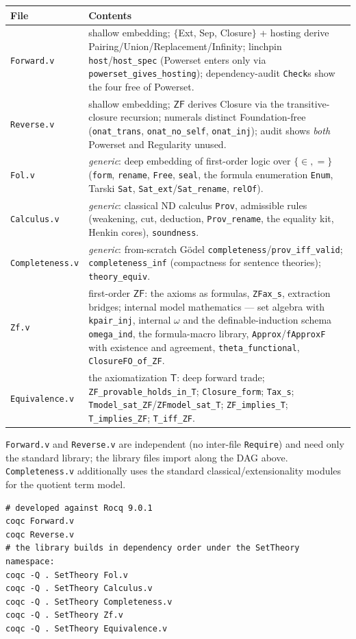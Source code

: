 \documentclass[11pt]{article}
\theoremstyle{plain}
\theoremstyle{definition}
\newcommand{\ZF}{\mathsf{ZF}}
\renewcommand{\ZF}{\textsf{ZF}}
\newcommand{\T}{\textsf{T}}
\newcommand{\cq}[1]{\lstinline[basicstyle=\ttfamily]|#1|}
\begin{document}
\begin{center}
\renewcommand{\arraystretch}{1.25}
\begin{tabular}{@{}lp{}@{}}
\toprule
File & Contents \\
\midrule
\texttt{Forward.v} & shallow embedding; $\{$Ext, Sep, Closure$\}$ + hosting derive Pairing/Union/Replacement/Infinity; linchpin \cq{host}/\cq{host_spec} (Powerset enters only via \cq{powerset_gives_hosting}); dependency-audit \cq{Check}s show the four free of Powerset. \\
\texttt{Reverse.v} & shallow embedding; $\ZF$ derives Closure via the transitive-closure recursion; numerals distinct Foundation-free (\cq{onat_trans}, \cq{onat_no_self}, \cq{onat_inj}); audit shows \emph{both} Powerset and Regularity unused. \\
\texttt{Fol.v} & \emph{generic}: deep embedding of first-order logic over $\{\in,=\}$ (\cq{form}, \cq{rename}, \cq{Free}, \cq{seal}, the formula enumeration \cq{Enum}, Tarski \cq{Sat}, \cq{Sat_ext}/\cq{Sat_rename}, \cq{relOf}). \\
\texttt{Calculus.v} & \emph{generic}: classical ND calculus \cq{Prov}, admissible rules (weakening, cut, deduction, \cq{Prov_rename}, the equality kit, Henkin cores), \cq{soundness}. \\
\texttt{Completeness.v} & \emph{generic}: from-scratch G\"odel \cq{completeness}/\cq{prov_iff_valid}; \cq{completeness_inf} (compactness for sentence theories); \cq{theory_equiv}. \\
\texttt{Zf.v} & first-order $\ZF$: the axioms as formulas, \cq{ZFax_s}, extraction bridges; internal model mathematics --- set algebra with \cq{kpair_inj}, internal $\omega$ and the definable-induction schema \cq{omega_ind}, the formula-macro library, \cq{Approx}/\cq{fApproxF} with existence and agreement, \cq{theta_functional}, \cq{ClosureFO_of_ZF}. \\
\texttt{Equivalence.v} & the axiomatization $\T$: deep forward trade; \cq{ZF_provable_holds_in_T}; \cq{Closure_form}; \cq{Tax_s}; \cq{Tmodel_sat_ZF}/\cq{ZFmodel_sat_T}; \cq{ZF_implies_T}; \cq{T_implies_ZF}; \cq{T_iff_ZF}. \\
\bottomrule
\end{tabular}
\end{center}

\texttt{Forward.v} and \texttt{Reverse.v} are independent (no inter-file
\cq{Require}) and need only the standard library; the library files import along
the DAG above. \texttt{Completeness.v} additionally uses the standard
classical/extensionality modules for the quotient term model.

\begin{lstlisting}[language={}]
# developed against Rocq 9.0.1
coqc Forward.v
coqc Reverse.v
# the library builds in dependency order under the SetTheory namespace:
coqc -Q . SetTheory Fol.v
coqc -Q . SetTheory Calculus.v
coqc -Q . SetTheory Completeness.v
coqc -Q . SetTheory Zf.v
coqc -Q . SetTheory Equivalence.v
\end{lstlisting}
\end{document}
